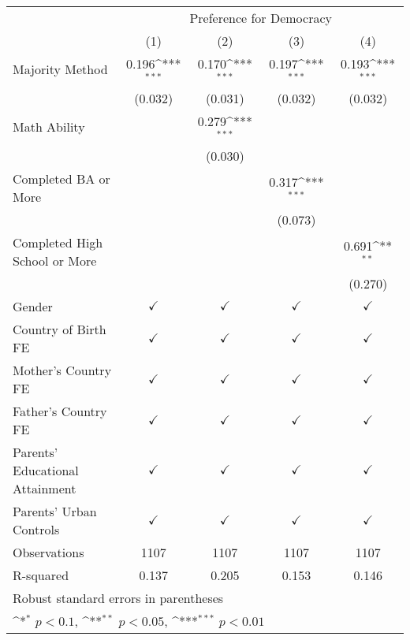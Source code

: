\documentclass[]{article}
\begin{document}
\begin{table}
\begin{adjustbox}{width=\columnwidth,center}

{
\def\sym#1{\ifmmode^{#1}\else\(^{#1}\)\fi}
\begin{tabular}{l*{4}{c}}
\hline\hline
                &\multicolumn{4}{c}{Preference for Democracy}                               \\\cmidrule(lr){2-5}
                &\multicolumn{1}{c}{(1)}         &\multicolumn{1}{c}{(2)}         &\multicolumn{1}{c}{(3)}         &\multicolumn{1}{c}{(4)}         \\
\hline
Majority Method &    0.196\sym{***}&    0.170\sym{***}&    0.197\sym{***}&    0.193\sym{***}\\
                &  (0.032)         &  (0.031)         &  (0.032)         &  (0.032)         \\
[1em]
Math Ability    &                  &    0.279\sym{***}&                  &                  \\
                &                  &  (0.030)         &                  &                  \\
[1em]
Completed BA or More&                  &                  &    0.317\sym{***}&                  \\
                &                  &                  &  (0.073)         &                  \\
[1em]
Completed High School or More&                  &                  &                  &    0.691\sym{**} \\
                &                  &                  &                  &  (0.270)         \\

\hline
Gender          &$\checkmark$         &$\checkmark$         &$\checkmark$         &$\checkmark$         \\
Country of Birth FE&$\checkmark$         &$\checkmark$         &$\checkmark$         &$\checkmark$         \\
Mother's Country FE&$\checkmark$         &$\checkmark$         &$\checkmark$         &$\checkmark$         \\
Father's Country FE&$\checkmark$         &$\checkmark$         &$\checkmark$         &$\checkmark$         \\
Parents' Educational Attainment&$\checkmark$         &$\checkmark$         &$\checkmark$         &$\checkmark$         \\
Parents' Urban Controls&$\checkmark$         &$\checkmark$         &$\checkmark$         &$\checkmark$         \\
Observations    & 1107  & 1107  & 1107   & 1107   \\
R-squared       &    0.137         &    0.205         &    0.153         &    0.146         \\
\hline\hline
\multicolumn{5}{l}{\footnotesize Robust standard errors in parentheses}\\
\multicolumn{5}{l}{\footnotesize \sym{*} \(p<0.1\), \sym{**} \(p<0.05\), \sym{***} \(p<0.01\)}\\
\end{tabular}
}




\end{adjustbox}
\end{table}
\end{document}
